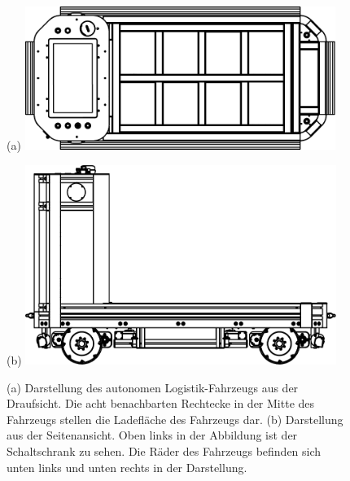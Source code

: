 		\begin{figure}[H]
			\begin{minipage}[b]{0.49\textwidth}
				(a)
				\includegraphics[width=0.9\textwidth]{Bilder/oben.pdf}
			\end{minipage}
			\begin{minipage}[b]{0.49\textwidth}
				(b)
				\includegraphics[width=0.9\textwidth]{Bilder/seite.pdf}
			\end{minipage}
			\centering
			\caption{(a) Darstellung des autonomen Logistik-Fahrzeugs aus der Draufsicht. Die acht benachbarten Rechtecke in der Mitte des Fahrzeugs stellen die Ladefläche des Fahrzeugs dar. (b) Darstellung aus der Seitenansicht. Oben links in der Abbildung ist der Schaltschrank zu sehen. Die Räder des Fahrzeugs befinden sich unten links und unten rechts in der Darstellung.}
			\label{fig: Darstellung des ALFs}
		\end{figure}
		
